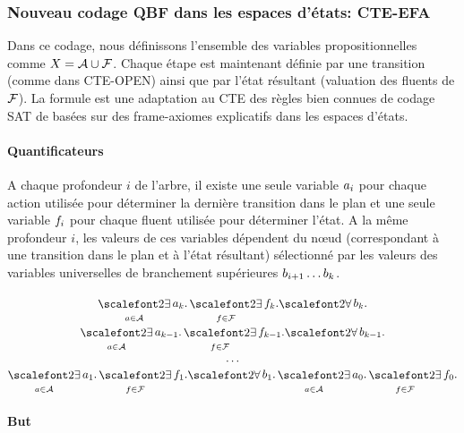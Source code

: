 %
%
\subsubsection{Nouveau codage QBF dans les espaces d'états: CTE-EFA}

Dans ce codage, nous définissons l'ensemble des variables propositionnelles comme $X = \mathcal{A} \cup \mathcal{F}$. Chaque étape est maintenant définie par une transition (comme dans CTE-OPEN) ainsi que par l'état résultant (valuation des fluents de $\mathcal{F}$). La formule est une adaptation au CTE des règles bien connues de codage SAT de \cite{KS92} basées sur des frame-axiomes explicatifs dans les espaces d'états.

\paragraph*{Quantificateurs}

A chaque profondeur $i$ de l'arbre, il existe une seule variable $a_{i}$ pour chaque action utilisée pour déterminer la dernière transition dans le plan et une seule variable $f_{i}$ pour chaque fluent utilisée pour déterminer l'état.
A la même profondeur $i$, les valeurs de ces variables dépendent du n\oe ud (correspondant à une transition dans le plan et à l'état résultant) sélectionné par les valeurs des variables universelles de branchement supérieures $b_{i+1}\ldots b_{k}$.

\begin{small}
\[
\begin{matrix}
\displaystyle \bigexists_{\a \in \A} \a_{\depth}. \bigexists_{\f\in \F} \f_{\depth}.%
\displaystyle {\bigforall b_{\depth}.}\\
\displaystyle \bigexists_{\a \in \A} \a_{\depth-1}. \bigexists_{\f\in \F} \f_{\depth-1}.%
\displaystyle {\bigforall b_{\depth-1}.}\\
\displaystyle \dots\\ 
\displaystyle \bigexists_{\a \in \A} \a_{1}. \bigexists_{\f\in \F} \f_{1}.%
\displaystyle {\bigforall b_{1}.}%
\displaystyle \bigexists_{\a \in \A} \a_{0}. \bigexists_{\f\in \F} \f_{0}.
\end{matrix}
\]
\end{small}%

\paragraph*{But}

